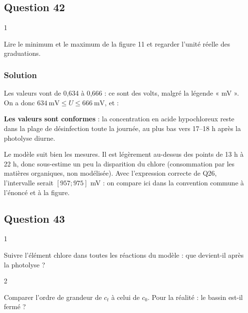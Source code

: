 \documentclass[11pt,a4paper]{article}
\newcommand{\equationajustee}[1]{%
  \sbox{\boiteequation}{$\displaystyle #1$}%
  \ifdim\wd\boiteequation>\linewidth
    \[\resizebox{\linewidth}{!}{\usebox{\boiteequation}}\]%
  \else
    \[#1\]%
  \fi}
\begin{document}
\hypertarget{question-42}{%
\subsection{Question 42}\label{question-42}}

\begin{indication}{1}

Lire le minimum et le maximum de la figure 11 et regarder l'unité réelle des graduations.

\end{indication}

\hypertarget{solution-41}{%
\subsubsection{Solution}\label{solution-41}}

Les valeurs vont de 0,634 à 0,666 : ce sont des volts, malgré la légende « mV ». On a donc \(634\ \text{mV}\le U\le666\ \text{mV}\), et :

\equationajustee{\boxed{[634;666]\ \text{mV}\subset[633;669]\ \text{mV}}}

\textbf{Les valeurs sont conformes} : la concentration en acide hypochloreux reste dans la plage de désinfection toute la journée, au plus bas vers 17--18 h après la photolyse diurne.

Le modèle suit bien les mesures. Il est légèrement au-dessus des points de 13 h à 22 h, donc sous-estime un peu la disparition du chlore (consommation par les matières organiques, non modélisée). Avec l'expression correcte de Q26, l'intervalle serait \([957;975]\) mV : on compare ici dans la convention commune à l'énoncé et à la figure.

\hypertarget{question-43}{%
\subsection{Question 43}\label{question-43}}

\begin{indication}{1}

Suivre l'élément chlore dans toutes les réactions du modèle : que devient-il après la photolyse ?

\end{indication}

\begin{indication}{2}

Comparer l'ordre de grandeur de \(c_t\) à celui de \(c_0\). Pour la réalité : le bassin est-il fermé ?

\end{indication}
\end{document}
